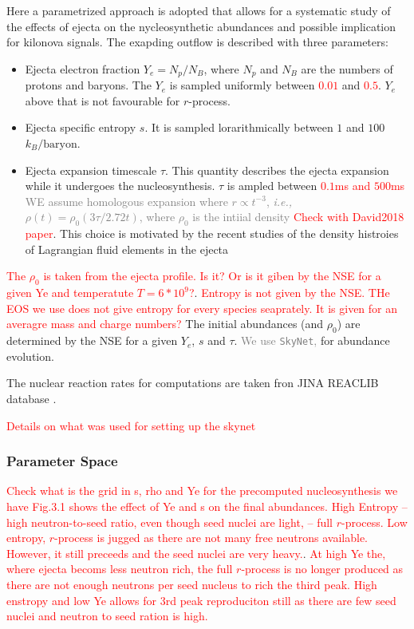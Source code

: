 \documentclass[11pt,a4paper,headinclude=true,DIV=14,BCOR=8mm,chapterprefix,listof=totoc,twoside,openright,abstracton]{scrbook}
\newcommand{\red}[1]{\textcolor{red}{#1}}
\newcommand{\gray}[1]{\textcolor{gray}{#1}}
\begin{document}
Here a parametrized approach is adopted that allows for a systematic study of the effects of ejecta on the nycleosynthetic abundances and possible implication for kilonova signals. 
The exapding outflow is described with three parameters:
\begin{itemize}
    \item Ejecta electron fraction $Y_e=N_p/N_B$, where $N_p$ and $N_B$ are the numbers of protons and baryons. The $Y_e$ is sampled uniformly between \red{$0.01$} and \red{$0.5$}. $Y_e$ above that is not favourable for $r$-process.
    \item Ejecta specific entropy $s$. It is sampled lorarithmically between $1$ and $100$ $k_B/\text{baryon}$.
    \item Ejecta expansion timescale $\tau$. This quantity describes the ejecta expansion while it undergoes the nucleosynthesis. $\tau$ is ampled between \red{$0.1$ms and $500$ms}
    \gray{WE assume homologous expansion where $r\propto t^{-3}$, \textit{i.e.,} $\rho(t) = \rho_0(3\tau / 2.72t)$,
    where $\rho_0$ is the intiial density} \red{Check with David2018 paper}. This choice is motivated by the recent studies of the density histroies of Lagrangian fluid elements in the ejecta \cite{Duez, 2015; Foucart et al., 2014}
\end{itemize}

\red{The $\rho_0$ is taken from the ejecta profile. Is it? Or is it giben by the NSE for a given Ye and temperatute $T=6*10^9$?}.
\red{Entropy is not given by the NSE. THe EOS we use does not give entropy for every species seaprately. It is given for an averagre mass and charge numbers?}
The initial abundances (and $\rho_0$) are determined by the NSE for a given $Y_e$, $s$ and $\tau$. \gray{We use \texttt{SkyNet}, \cite{Lippuner and Roberts, 2017}} for abundance evolution. 

The nuclear reaction rates for computations are taken fron JINA REACLIB database \cite{Cyburt et al., 2010}.

\red{Details on what was used for setting up the skynet}


\subsubsection{Parameter Space}

\red{Check what is the grid in s, rho and Ye for the precomputed nucleosynthesis we have}
\red{Fig.3.1 shows the effect of Ye and s on the final abundances. High Entropy -- high neutron-to-seed ratio, even though seed nuclei are light, -- full $r$-process. Low entropy, $r$-process is jugged as there are not many free neutrons available. However, it still preceeds and the seed nuclei are very heavy.}.
\red{At high Ye the, where ejecta becoms less neutron rich, the full $r$-process is no longer produced as there are not enough neutrons per seed nucleus to rich the third peak.}
\red{High enstropy and low Ye allows for 3rd peak reproduciton still as there are few seed nuclei and neutron to seed ration is high.}
\end{document}
